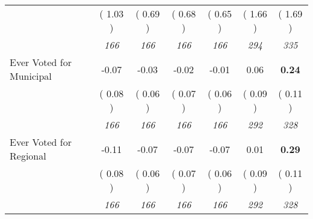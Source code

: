 \begin{tabular}{l c c c c c c}
& (     1.03 ) & (     0.69 ) & (     0.68 ) & (     0.65 ) & (     1.66 ) & (     1.69 ) \\
& \textit{ 166 } & \textit{ 166 } & \textit{ 166 } & \textit{ 166 } & \textit{ 294 } & \textit{ 335 } \\
Ever Voted for Municipal &     -0.07 &     -0.03 &     -0.02 &     -0.01 &      0.06 & \textbf{      0.24 } \\
& (     0.08 ) & (     0.06 ) & (     0.07 ) & (     0.06 ) & (     0.09 ) & (     0.11 ) \\
& \textit{ 166 } & \textit{ 166 } & \textit{ 166 } & \textit{ 166 } & \textit{ 292 } & \textit{ 328 } \\
Ever Voted for Regional &     -0.11 &     -0.07 &     -0.07 &     -0.07 &      0.01 & \textbf{      0.29 } \\
& (     0.08 ) & (     0.06 ) & (     0.07 ) & (     0.06 ) & (     0.09 ) & (     0.11 ) \\
& \textit{ 166 } & \textit{ 166 } & \textit{ 166 } & \textit{ 166 } & \textit{ 292 } & \textit{ 328 } \\
\bottomrule
\end{tabular}
